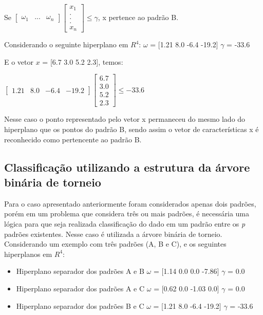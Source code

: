 Se $ \begin{bmatrix}
\omega _{1} & ... & \omega _{n} 
\end{bmatrix}
\begin{bmatrix}
x_{1}
\\ 
.
\\
. 
\\
. 
\\
x_{n}
\end{bmatrix}
\leq  \gamma $, x pertence ao padrão B.

Considerando o seguinte hiperplano em $R^{4}$:
$\omega$ = [1.21  8.0  -6.4  -19.2]
$\gamma$ = -33.6

E o vetor $x$ = [6.7  3.0  5.2  2.3], temos:

$ \begin{bmatrix}
1.21 & 8.0 & -6.4 & -19.2 
\end{bmatrix}
\begin{bmatrix}
6.7
\\ 
3.0
\\
5.2 
\\
2.3 
\end{bmatrix}
\leq  -33.6 $ 

Nesse caso o ponto representado pelo vetor x permaneceu do mesmo lado do hiperplano que os pontos do padrão B, sendo assim o vetor de características x é reconhecido como pertencente ao padrão B. 

\subsection{Classificação utilizando a estrutura da árvore binária de torneio}
Para o caso apresentado anteriormente foram considerados apenas dois padrões, porém em um problema que considera três ou mais padrões, é necessária uma lógica para que seja realizada classificação do dado em um padrão entre os \textit{p} padrões existentes. Nesse caso é utilizada a árvore binária de torneio.
Considerando um exemplo com três padrões (A, B e C), e os seguintes hiperplanos em $R^{4}$:
\begin{itemize}
\item Hiperplano separador dos padrões A e B
\subitem $\omega$ = [1.14  0.0  0.0  -7.86]
\subitem $\gamma$ = 0.0
\item Hiperplano separador dos padrões A e C
\subitem $\omega$ = [0.62  0.0  -1.03  0.0]
\subitem $\gamma$ = 0.0
\item Hiperplano separador dos padrões B e C
\subitem $\omega$ = [1.21  8.0  -6.4  -19.2]
\subitem $\gamma$ = -33.6
\end{itemize}

